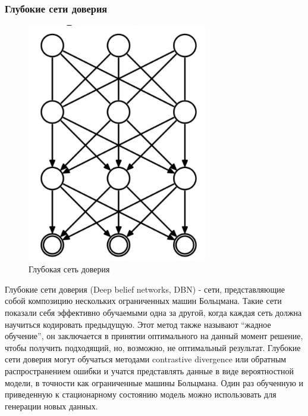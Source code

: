 \subsubsection{Глубокие сети доверия}
\begin{figure}[htbp]
	\centering
			\caption{Глубокая сеть доверия}
	\includegraphics[width=0.7\textwidth]{fig/DBN}
\end{figure}
Глубокие сети доверия (Deep belief networks, DBN) - сети, представляющие собой композицию нескольких ограниченных машин Больцмана. Такие сети показали себя эффективно обучаемыми одна за другой, когда каждая сеть должна научиться кодировать предыдущую. Этот метод также называют “жадное обучение”, он заключается в принятии оптимального на данный момент решение, чтобы получить подходящий, но, возможно, не оптимальный результат. Глубокие сети доверия могут обучаться методами contrastive divergence или обратным распространением ошибки и учатся представлять данные в виде вероятностной модели, в точности как ограниченные машины Больцмана. Один раз обученную и приведенную к стационарному состоянию модель можно использовать для генерации новых данных.




